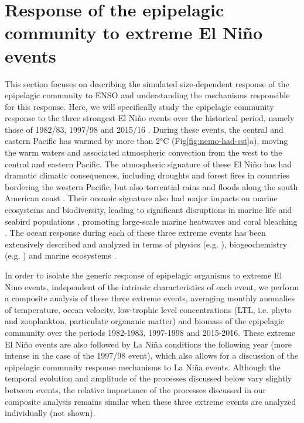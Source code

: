 
\section{Response of the epipelagic community to extreme El Niño events}
\label{sec:nino-epi}

This section focuses on describing the simulated size-dependent response of the epipelagic community to ENSO and understanding the mechanisms responsible for this response. Here, we will specifically study the epipelagic community response to the three strongest El Niño events over the historical period, namely those of 1982/83, 1997/98 and 2015/16 \citep{santosoDefiningCharacteristicsENSO2017}. During these events, the central and eastern Pacific has warmed by more than 2°C (Fig\ref{fig:nemo-had-sst}a), moving the warm waters and associated atmospheric convection from the west to the central and eastern Pacific. The atmospheric signature of these El Niño has had dramatic climatic consequences, including droughts and forest fires in countries bordering the western Pacific, but also torrential rains and floods along the south American coast \citep{caiClimateImpactsNino2020}. Their oceanic signature also had major impacts on marine ecosystems and biodiversity, leading to significant disruptions in marine life and seabird populations \citep{valleImpact198219831987}, promoting large-scale marine heatwaves \citep{holbrookKeepingPaceMarine2020} and coral bleaching \citep{claarGlobalPatternsImpacts2018}.  The ocean response during each of these three extreme events has been extensively described and analyzed in terms of physics (e.g. \citealp{philanderChapter33Simulation1985, lengaigneOceanResponseMarch2002, puyModulationEquatorialPacific2019}), biogeochemistry (e.g. \citealp{barberBiologicalConsequencesNino1983, chavezBiologicalChemicalResponse1999, strammaObservedNinoConditions2016}) and marine ecosystems \citep{glynnNINOSOUTHERNOSCILLATION198219831988, glynnCoralBleachingMortality2001, eakin20142017Globalscale2019}. 

In order to isolate the generic response of epipelagic organisms to extreme El Nino events, independent of the intrinsic characteristics of each event, we perform a composite analysis of these three extreme events, averaging monthly anomalies of temperature, ocean velocity, low-trophic level concentrations (LTL, i.e. phyto and zooplankton, particulate organanic matter) and biomass of the epipelagic community over the periods 1982-1983, 1997-1998 and 2015-2016. These extreme El Niño events are also followed by La Niña conditions the following year (more intense in the case of the 1997/98 event), which also allows for a discussion  of the epipelagic community response mechanisms to La Niña events. Although the temporal evolution and amplitude of the processes discussed below vary slightly between events, the relative importance of the processes discussed in our composite analysis remains similar when these three extreme events are analyzed individually (not shown). 

